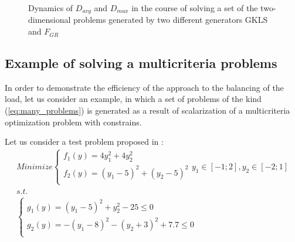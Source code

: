\documentclass[runningheads]{llncs}
\begin{document}
\begin{figure}[ht]
    \centering
    \caption{Dynamics of \(D_{avg}\) and \(D_{max}\) in the course of solving a set of the two-
dimensional problems generated by two different generators GKLS and \(F_{GR}\)}
    \label{fig:devs_mixed}
\end{figure}

\subsection{Example of solving a multicriteria problems}

In order to demonstrate the efficiency of the approach to the balancing of the load, let us
consider an example, in which a set of problems of the kind (\ref{eq:many_problems}) is
generated as a result of scalarization of a multicriteria optimization problem with constrains.

Let us consider a test problem proposed in \cite{BinhKorn1999}:
\begin{equation}
  \label{eq:mco_probem}
  \begin{array}{l}
      Minimize \left \{
      \begin{array}{l}
        f_1(y) = 4 y_1^2 + 4 y_2^2 \\
        f_2(y) = (y_1-5)^2 + (y_2-5)^2 \\
      \end{array}
      \right .
      y_1\in [-1;2],y_2\in [-2;1]
      \\s.t.
      \\
      \left \{
      \begin{array}{l}
        g_1(y) = (y_1 - 5)^2 + y_2^2 - 25 \leqslant 0 \\
        g_2(y) = -(y_1 - 8)^2 - (y_2 + 3)^2 + 7.7 \leqslant 0\\
      \end{array}
      \right .
  \end{array}
\end{equation}
\end{document}
